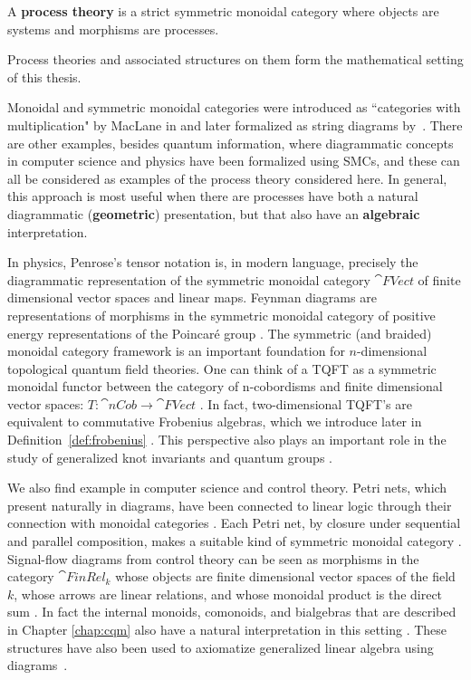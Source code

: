 \begin{defn}
A \textbf{process theory} is a strict symmetric monoidal category where objects are systems and morphisms are processes.
\end{defn}

\noindent Process theories and associated structures on them form the mathematical setting of this thesis.

Monoidal and symmetric monoidal categories were introduced as ``categories with multiplication" by MacLane in \cite{maclane1963natural} and later formalized as string diagrams by~\cite{joyal1991geometry}. There are other examples, besides quantum information, where diagrammatic concepts in computer science and physics have been formalized using SMCs, and these can all be considered as examples of the process theory considered here.  In general, this approach is most useful when there are processes have both a natural diagrammatic (\textbf{geometric}) presentation, but that also have an \textbf{algebraic} interpretation.

In physics, Penrose's tensor notation \cite{penrose1971applications} is, in modern language, precisely the diagrammatic representation of the symmetric monoidal category $\cat{FVect}$ of finite dimensional vector spaces and linear maps. Feynman diagrams are representations of morphisms in the symmetric monoidal category of positive energy representations of the Poincar\'{e} group \cite{baez2009prehistory}. The symmetric (and braided) monoidal category framework is an important foundation for $n$-dimensional topological quantum field theories. One can think of a TQFT as a symmetric monoidal functor between the category of n-cobordisms and finite dimensional vector spaces: $T:\cat{nCob}\to \cat{FVect}$ \cite{atiyah1988topological}. In fact, two-dimensional TQFT's are equivalent to commutative Frobenius algebras, which we introduce later in Definition~\ref{def:frobenius} \cite{abrams1996two,kock2004frobenius}. This perspective also plays an important role in the study of generalized knot invariants \cite{reshetikhin1990ribbon} and quantum groups \cite{baez2009prehistory}. 

We also find example in computer science and control theory. Petri nets, which present naturally in diagrams, have been connected to linear logic through their connection with monoidal categories \cite{abramsky2008petri,marti1989petri,sassone1998axiomatization}. Each Petri net, by closure under sequential and parallel composition, makes a suitable kind of symmetric monoidal category \cite{marti1989petri,meseguer1990petri}. Signal-flow diagrams from control theory can be seen as morphisms in the category $\cat{FinRel_k}$ whose objects are finite dimensional vector spaces of the field $k$, whose arrows are linear relations, and whose monoidal product is the direct sum \cite{baez2014categories}.  In fact the internal monoids, comonoids, and bialgebras that are described in Chapter \ref{chap:cqm} also have a natural interpretation in this setting \cite{baez2014categories,bonchi2015full}. These structures have also been used to axiomatize generalized linear algebra using diagrams~\cite{bonchi2014interacting}.
 
